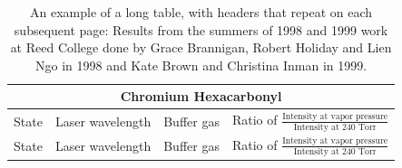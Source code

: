 \documentclass[12pt,twoside]{reedthesis}
\begin{document}
	\begin{longtable}{||c|c|c|c||}
	 	\caption[Long Table]{An example of a long table, with headers that repeat on each subsequent page: Results from the summers of 1998 and 1999 work at Reed College done
by Grace Brannigan, Robert Holiday and Lien Ngo in 1998 and Kate Brown and
Christina Inman in 1999.}\\ \hline
	    	  \multicolumn{4}{||c||}{Chromium Hexacarbonyl} \\\hline
		   State & Laser wavelength & Buffer gas & Ratio of $\frac{\textrm{Intensity
at vapor pressure}}{\textrm{Intensity at 240 Torr}}$ \\ \hline
		  \endfirsthead
		\hline     State & Laser wavelength & Buffer gas & Ratio of
$\frac{\textrm{Intensity at vapor pressure}}{\textrm{Intensity at 240 Torr}}$\\
\hline
		    \endhead


\end{longtable}
\end{document}
